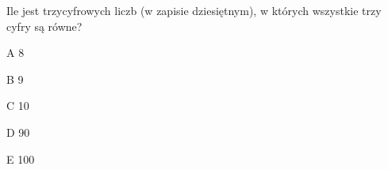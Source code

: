 \begin{tresc}
Ile jest trzycyfrowych liczb (w zapisie dziesiętnym), w których wszystkie trzy cyfry są równe?
\end{tresc}
\begin{wariant}{A} 8 \end{wariant}
\begin{wariant}{B} 9 \end{wariant}
\begin{wariant}{C} 10 \end{wariant}
\begin{wariant}{D} 90 \end{wariant}
\begin{wariant}{E} 100 \end{wariant}
